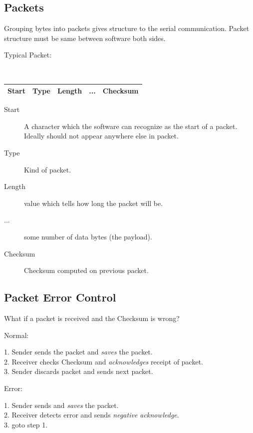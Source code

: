 \subsection{Packets}

Grouping bytes into packets gives structure
to the serial communication.   Packet structure
must be same between software both sides.

Typical Packet:


{\tt
\begin{tabular}{|c|c|c|c|c|}
\hline
Start &   Type & Length  & ... & Checksum  \\
\hline
\end{tabular}
}

\begin{description}
        \item[Start] A character which the software can recognize
        as the start of a packet.   Ideally should not appear anywhere
        else in packet.
        \item[Type] Kind of packet.
        \item[Length] value which tells how long the
        packet will be.
        \item[...] some number of data bytes (the payload).
        \item[Checksum] Checksum computed on previous packet.
\end{description}

\subsection{Packet Error Control}

What if a packet is received and the Checksum is wrong?

\noindent
Normal:

1. Sender sends the packet and {\it saves} the packet.\\
2. Receiver checks Checksum and {\it acknowledges} receipt of packet.\\
3. Sender discards packet and sends next packet.

\noindent
Error:

1. Sender sends and {\it saves} the packet.\\
2. Receiver detects error and sends {\it negative acknowledge}.\\
3. goto step 1.


